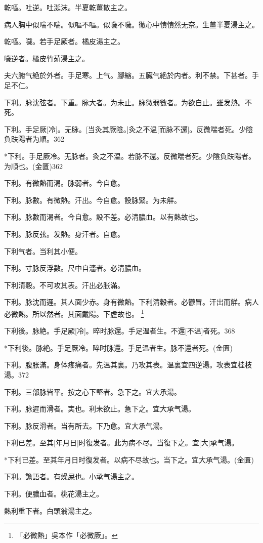 \documentclass[12pt,twoside,UTF8,b5paper]{ctexbook}
\begin{document}
乾嘔。吐逆。吐涎沫。半夏乾薑散主之。

病人胸中似喘不喘。似嘔不嘔。似噦不噦。徹心中憒憒然无奈。生薑半夏湯主之。

乾嘔。噦。若手足厥者。橘皮湯主之。

噦逆者。橘皮竹茹湯主之。

夫六腑气絶於外者。手足寒。上气。腳縮。五臓气絶於内者。利不禁。下甚者。手足不仁。

下利。脉沈弦者。下重。脉大者。为未止。脉微弱數者。为欲自止。雖发熱。不死。

下利。手足厥[冷]。无脉。[当灸其厥陰。]灸之不温[而脉不還]。反微喘者死。少陰負趺陽者为順。362

*下利。手足厥冷。无脉者。灸之不温。若脉不還。反微喘者死。少陰負趺陽者。为順也。(金匱)362

下利。有微熱而渴。脉弱者。今自愈。

下利。脉數。有微熱。汗出。今自愈。設脉緊。为未觧。

下利。脉數而渴者。今自愈。設不差。必清膿血。以有熱故也。

下利。脉反弦。发熱。身汗者。自愈。

下利气者。当利其小便。

下利。寸脉反浮數。尺中自濇者。必清膿血。

下利清穀。不可攻其表。汗出必胀滿。

下利。脉沈而遲。其人面少赤。身有微熱。下利清穀者。必鬱冒。汗出而觧。病人必微熱。所以然者。其面戴陽。下虗故也。
	\footnote{「必微熱」吳本作「必微厥」。}

下利後。脉絶。手足厥[冷]。晬时脉還。手足温者生。不還[不温]者死。368

*下利後。脉絶。手足厥冷。晬时脉還。手足温者生。脉不還者死。(金匱)

下利。腹胀滿。身体疼痛者。先温其裏。乃攻其表。温裏宜四逆湯。攻表宜桂枝湯。372

下利。三部脉皆平。按之心下堅者。急下之。宜大承湯。

下利。脉遲而滑者。実也。利未欲止。急下之。宜大承气湯。

下利。脉反滑者。当有所去。下乃愈。宜大承气湯。

下利已差。至其[年月日]时復发者。此为病不尽。当復下之。宜[大]承气湯。

*下利已差。至其年月日时復发者。以病不尽故也。当下之。宜大承气湯。(金匱)

下利。譫語者。有燥屎也。小承气湯主之。

下利。便膿血者。桃花湯主之。

熱利重下者。白頭翁湯主之。
\end{document}
